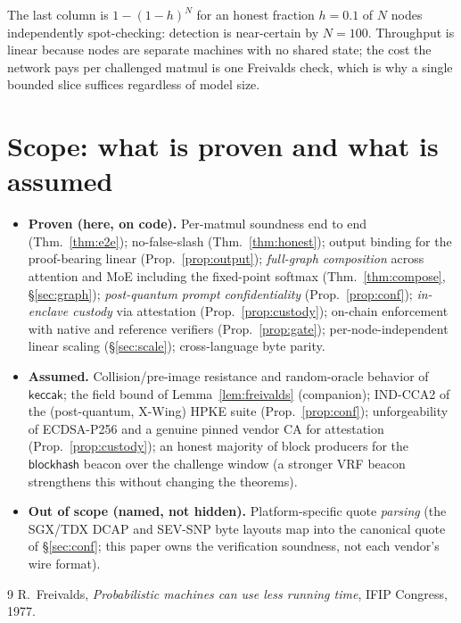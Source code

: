 \documentclass[11pt]{article}
\newcommand{\keccak}{\mathsf{keccak}}
\begin{document}
\noindent The last column is $1-(1-h)^{N}$ for an honest fraction $h=0.1$ of $N$ nodes independently
spot-checking: detection is near-certain by $N=100$. Throughput is linear because nodes are separate
machines with no shared state; the cost the network pays per challenged matmul is one Freivalds check,
which is why a single bounded slice suffices regardless of model size.

\section{Scope: what is proven and what is assumed}

\begin{itemize}[leftmargin=1.4em]
\item \textbf{Proven (here, on code).} Per-matmul soundness end to end (Thm.~\ref{thm:e2e});
no-false-slash (Thm.~\ref{thm:honest}); output binding for the proof-bearing linear
(Prop.~\ref{prop:output}); \emph{full-graph composition} across attention and MoE including the
fixed-point softmax (Thm.~\ref{thm:compose}, \S\ref{sec:graph}); \emph{post-quantum prompt
confidentiality} (Prop.~\ref{prop:conf}); \emph{in-enclave custody} via attestation
(Prop.~\ref{prop:custody}); on-chain enforcement with native and reference verifiers
(Prop.~\ref{prop:gate}); per-node-independent linear scaling (\S\ref{sec:scale}); cross-language byte
parity.
\item \textbf{Assumed.} Collision/pre-image resistance and random-oracle behavior of $\keccak$; the
field bound of Lemma~\ref{lem:freivalds} (companion); IND-CCA2 of the (post-quantum, X-Wing) HPKE suite
(Prop.~\ref{prop:conf}); unforgeability of ECDSA-P256 and a genuine pinned vendor CA for attestation
(Prop.~\ref{prop:custody}); an honest majority of block producers for the $\mathsf{blockhash}$ beacon
over the challenge window (a stronger VRF beacon strengthens this without changing the theorems).
\item \textbf{Out of scope (named, not hidden).} Platform-specific quote \emph{parsing} (the SGX/TDX
DCAP and SEV-SNP byte layouts map into the canonical quote of \S\ref{sec:conf}; this paper owns the
verification soundness, not each vendor's wire format).
\end{itemize}

\begin{thebibliography}{9}
 R.~Freivalds, \emph{Probabilistic machines can use less running time}, IFIP
Congress, 1977.
\end{thebibliography}
\end{document}
